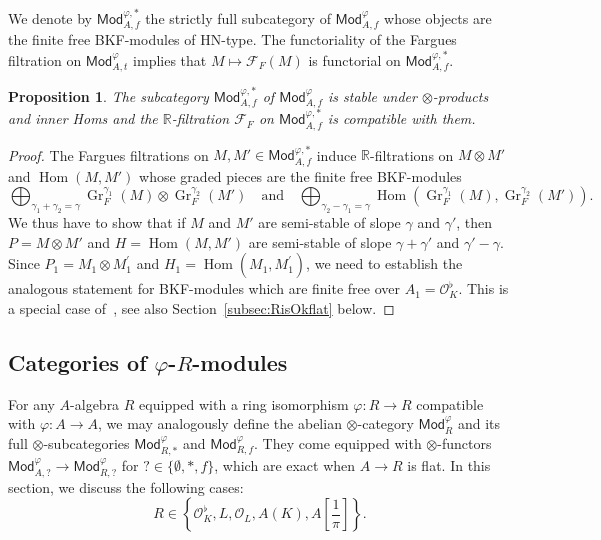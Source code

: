 \documentclass[11pt]{article}
\newtheorem{prop}[theo]{Proposition}
\theoremstyle{definition}
\numberwithin{equation}{section}
\numberwithin{figure}{section}
\numberwithin{table}{section}
\newcommand{\Mod}{\mathsf{Mod}}
\DeclareMathOperator{\Hom}{Hom}
\DeclareMathOperator{\Gr}{Gr}
\begin{document}
We denote by $\Mod_{A,f}^{\varphi,\ast}$ the strictly full subcategory of $\Mod_{A,f}^{\varphi}$ whose objects are the finite free BKF-modules of HN-type. The functoriality of the Fargues filtration on $\Mod_{A,t}^{\varphi}$ implies that $M\mapsto\mathcal{F}_{F}(M)$ is functorial on $\Mod_{A,f}^{\varphi,\ast}$.

\begin{prop}\label{prop:catOfHNTypeTensor}
The subcategory $\Mod_{A,f}^{\varphi,\ast}$ of $\Mod_{A,f}^{\varphi}$ is stable under $\otimes$-products and inner Homs and the $\mathbb{R}$-filtration $\mathcal{F}_{F}$ on $\Mod_{A,f}^{\varphi,\ast}$ is compatible with them.
\end{prop}
\begin{proof}
The Fargues filtrations on $M,M'\in\Mod_{A,f}^{\varphi,\ast}$ induce $\mathbb{R}$-filtrations on $M\otimes M'$ and $\Hom(M,M')$ whose graded pieces are the finite free BKF-modules
\[
\bigoplus_{\gamma_{1}+\gamma_{2}=\gamma}\Gr_{F}^{\gamma_{1}}(M)\otimes\Gr_{F}^{\gamma_{2}}(M')\quad\text{and}\quad\bigoplus_{\gamma_{2}-\gamma_{1}=\gamma}\Hom(\Gr_{F}^{\gamma_{1}}(M),\Gr_{F}^{\gamma_{2}}(M')).
\]
We thus have to show that if $M$ and $M'$ are semi-stable of slope $\gamma$ and $\gamma'$, then $P=M\otimes M'$ and $H=\Hom(M,M')$ are semi-stable of slope $\gamma+\gamma'$ and $\gamma'-\gamma$. Since $P_{1}=M_{1}\otimes M_{1}^{\prime}$ and $H_{1}=\Hom(M_{1},M_{1}^{\prime})$, we need to establish the analogous statement for BKF-modules which are finite free over $A_{1}=\mathcal{O}_{K}^{\flat}$. This is a special case of~\cite[\S 5.3]{Co16}, see also Section~\ref{subsec:RisOkflat} below.
\end{proof}

\subsection{Categories of \texorpdfstring{$\varphi$}{phi}-\texorpdfstring{$R$}{R}-modules}

For any $A$-algebra $R$ equipped with a ring isomorphism $\varphi:R\rightarrow R$ compatible with $\varphi:A\rightarrow A$, we may analogously define the abelian $\otimes$-category $\Mod_{R}^{\varphi}$ and its full $\otimes$-subcategories $\Mod_{R,\ast}^{\varphi}$ and $\Mod_{R,f}^{\varphi}$. They come equipped with $\otimes$-functors $\Mod_{A,?}^{\varphi}\rightarrow\Mod_{R,?}^{\varphi}$ for $?\in\{\emptyset,\ast,f\}$, which are exact when $A\rightarrow R$ is flat. In this section, we discuss the following cases:
\[
R\in\left\{ \mathcal{O}_{K}^{\flat},L,\mathcal{O}_{L},A(K),A\left[{\frac{1}{\pi}}\right]\right\}.
\]
\end{document}
